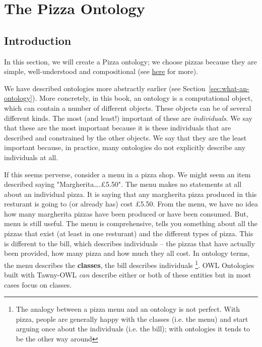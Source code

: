 
\chapter{The Pizza Ontology}
\label{cha:pizza-ontology}

\section{Introduction}
\label{sec:introduction}

In this section, we will create a Pizza ontology; we choose pizzas because
they are simple, well-understood and compositional (see
\href{http://robertdavidstevens.wordpress.com/2010/01/22/why-the-pizza-ontology-tutorial/}{here}
for more).

We have described ontologies more abstractly
earlier (see Section~\ref{sec:what-an-ontology}). More concretely, in this book, an
ontology is a computational object, which can contain a number of different
objects. These objects can be of several different kinds. The most (and
least!) important of these are \emph{individuals}. We say that these are the
most important because it is these individuals that are described and
constrained by the other objects. We say that they are the least important
because, in practice, many ontologies do not explicitly describe any
individuals at all.

If this seems perverse, consider a menu in a pizza shop. We might seem
an item described saying "Margherita\ldots{}.£5.50". The menu makes no
statements at all about an individual pizza. It is saying that any
margherita pizza produced in this resturant is going to (or already has)
cost £5.50. From the menu, we have no idea how many margherita pizzas
have been produced or have been consumed. But, menu is still useful. The
menu is comprehensive, tells you something about all the pizzas that
exist (at least in one resturant) and the different types of pizza. This
is different to the bill, which describes individuals -- the pizzas that
have actually been provided, how many pizza and how much they all cost.
In ontology terms, the menu describes the \textbf{classes}, the bill describes
individuals \footnote{The analogy between a pizza menu and an ontology
is not perfect. With pizza, people are generally happy with the classes
(i.e. the menu) and start arguing once about the individuals (i.e. the
bill); with ontologies it tends to be the other way around}. OWL
Ontologies built with Tawny-OWL \emph{can} describe either or both of these
entities but in most cases focus on classes.

